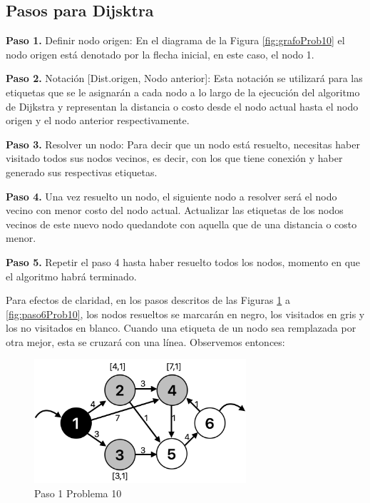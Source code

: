 \documentclass[12pt]{article}  %
\begin{document}
\subsection{Pasos para Dijsktra}

\textbf{Paso 1.} Definir nodo origen: En el diagrama de la Figura \ref{fig:grafoProb10} el nodo origen está denotado por la flecha inicial, en este caso, el nodo 1.

\textbf{Paso 2.} Notación [Dist.origen, Nodo anterior]: Esta notación se utilizará para las etiquetas que se le asignarán a cada nodo a lo largo de la ejecución del algoritmo de Dijkstra y representan la distancia o costo desde el nodo actual hasta el nodo origen y el nodo anterior respectivamente.

\textbf{Paso 3.} Resolver un nodo: Para decir que un nodo está resuelto, necesitas haber visitado todos sus nodos vecinos, es decir, con los que tiene conexión y haber generado sus respectivas etiquetas.

\textbf{Paso 4.} Una vez resuelto un nodo, el siguiente nodo a resolver será el nodo vecino con menor costo del nodo actual. Actualizar las etiquetas de los nodos vecinos de este nuevo nodo quedandote con aquella que de una distancia o costo menor.

\textbf{Paso 5.} Repetir el paso 4 hasta haber resuelto todos los nodos, momento en que el algoritmo habrá terminado.

Para efectos de claridad, en los pasos descritos de las Figuras \ref{fig:paso1Prob10} a \ref{fig:paso6Prob10}, los nodos resueltos se marcarán en negro, los visitados en gris y los no visitados en blanco. Cuando una etiqueta de un nodo sea remplazada por otra mejor, esta se cruzará con una línea. Observemos entonces:

\begin{figure}[H]
\centering
\caption{Paso 1 Problema 10}
\label{fig:paso1Prob10}
\includegraphics[width=0.7\textwidth]{assets/paso1Prob10.png}
\end{figure}
\end{document}
